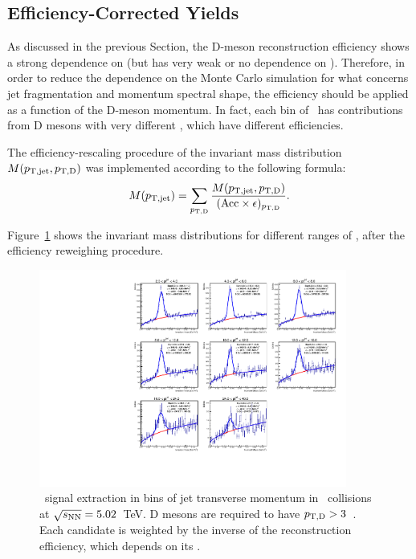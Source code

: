 
\subsection{Efficiency-Corrected Yields}

As discussed in the previous Section, the D-meson reconstruction efficiency shows a strong dependence on \ptd (but has very weak or no dependence on \ptjet).
Therefore, in order to reduce the dependence on the Monte Carlo simulation for what concerns jet fragmentation and momentum spectral shape,
the efficiency should be applied as a function of the D-meson momentum. In fact, each bin of \ptjet\ has contributions from D mesons with very different \ptd,
which have different efficiencies.

The efficiency-rescaling procedure of the invariant mass distribution $M(p_{\mathrm{T,jet}},p_{\mathrm{T,D}})$ was implemented according to the following formula:
\begin{equation}
M(p_{\mathrm{T,jet}}) = \displaystyle\sum_{p_{\mathrm{T,D}}}\frac{M(p_{\mathrm{T,jet}},p_{\mathrm{T,D}})}{({\rm Acc} \times \epsilon)_{p_{\mathrm{T,D}}}}.
\end{equation}

Figure~\ref{fig:eq_pPb_InvMass_corrDrec} shows the invariant mass distributions for different ranges of \ptchjet, after the efficiency reweighing procedure.

\begin{figure}[bth]
\centering
\includegraphics[width=0.9\textwidth]{pPbplots/plotsEffScale_pt3_noDetails/invMass_FASTwoSDD}
\caption{\Dstar\ signal extraction in bins of jet transverse momentum in \pPb\ collisions at $\sqrt{s_{\rm NN}}=5.02$~TeV. D mesons are required to have $p_{\mathrm{T,D}}>3$~\GeVc.
Each candidate is weighted by the inverse of the reconstruction efficiency, which depends on its \ptd.}
\label{fig:eq_pPb_InvMass_corrDrec}
\end{figure}

